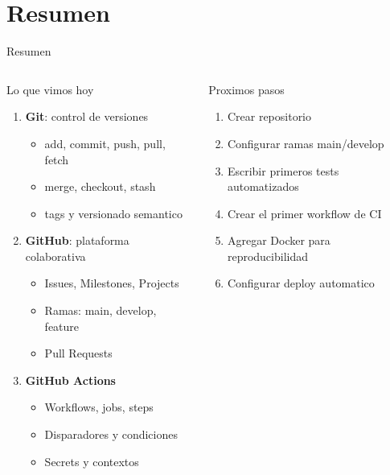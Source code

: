\documentclass[aspectratio=169]{beamer}
\begin{document}

\section{Resumen}

\begin{frame}{Resumen}
  \begin{columns}
    \begin{block}{Lo que vimos hoy}
      \begin{enumerate}
        \item \textbf{Git}: control de versiones
          \begin{itemize}
            \item add, commit, push, pull, fetch
            \item merge, checkout, stash
            \item tags y versionado semantico
          \end{itemize}
        \item \textbf{GitHub}: plataforma colaborativa
          \begin{itemize}
            \item Issues, Milestones, Projects
            \item Ramas: main, develop, feature
            \item Pull Requests
          \end{itemize}
        \item \textbf{GitHub Actions}
          \begin{itemize}
            \item Workflows, jobs, steps
            \item Disparadores y condiciones
            \item Secrets y contextos
          \end{itemize}
      \end{enumerate}
    \end{block}

    \begin{exampleblock}{Proximos pasos}
      \begin{enumerate}
        \item Crear repositorio
        \item Configurar ramas main/develop
        \item Escribir primeros tests automatizados
        \item Crear el primer workflow de CI
        \item Agregar Docker para reproducibilidad
        \item Configurar deploy automatico
      \end{enumerate}
    \end{exampleblock}


\end{columns}
\end{frame}
\end{document}
